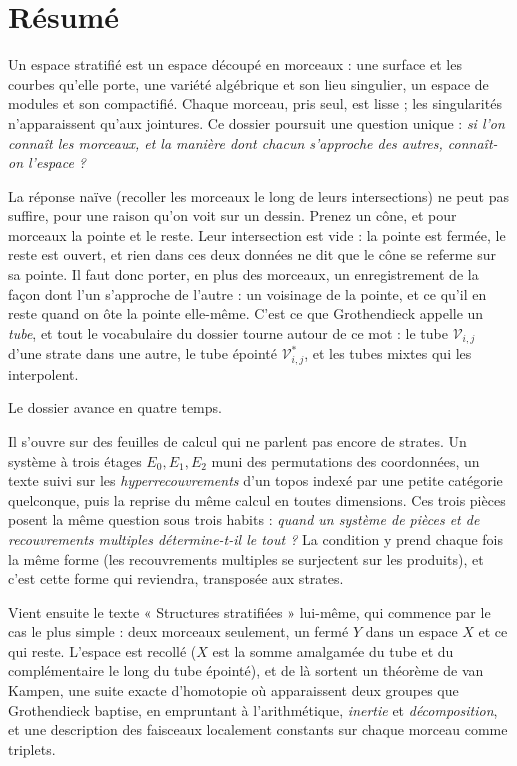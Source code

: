 \documentclass[11pt,a4paper]{article}
\begin{document}
\section*{Résumé}

\begin{resume}
Un espace stratifié est un espace découpé en morceaux : une surface et les
courbes qu'elle porte, une variété algébrique et son lieu singulier, un espace
de modules et son compactifié. Chaque morceau, pris seul, est lisse ; les
singularités n'apparaissent qu'aux jointures. Ce dossier poursuit une question
unique : \emph{si l'on connaît les morceaux, et la manière dont chacun
s'approche des autres, connaît-on l'espace ?}

La réponse naïve (recoller les morceaux le long de leurs intersections) ne
peut pas suffire, pour une raison qu'on voit sur un dessin. Prenez un cône,
et pour morceaux la pointe et le reste. Leur intersection est vide : la pointe
est fermée, le reste est ouvert, et rien dans ces deux données ne dit que le
cône se referme sur sa pointe. Il faut donc porter, en plus des morceaux, un
enregistrement de la façon dont l'un s'approche de l'autre : un voisinage de la
pointe, et ce qu'il en reste quand on ôte la pointe elle-même. C'est ce que
Grothendieck appelle un \emph{tube}, et tout le vocabulaire du dossier tourne
autour de ce mot : le tube $\mathcal{V}_{i,j}$ d'une strate dans une autre, le
tube épointé $\mathcal{V}^{*}_{i,j}$, et les tubes mixtes qui les interpolent.

Le dossier avance en quatre temps.

Il s'ouvre sur des feuilles de calcul qui ne parlent pas encore de strates. Un
système à trois étages $E_{0}, E_{1}, E_{2}$ muni des permutations des
coordonnées, un texte suivi sur les \emph{hyperrecouvrements} d'un topos indexé
par une petite catégorie quelconque, puis la reprise du même calcul en toutes
dimensions. Ces trois pièces posent la même question sous trois habits :
\emph{quand un système de pièces et de recouvrements multiples détermine-t-il
le tout ?} La condition y prend chaque fois la même forme (les recouvrements
multiples se surjectent sur les produits), et c'est cette forme qui reviendra,
transposée aux strates.

Vient ensuite le texte « Structures stratifiées » lui-même, qui commence par le
cas le plus simple : deux morceaux seulement, un fermé $Y$ dans un espace $X$
et ce qui reste. L'espace est recollé ($X$ est la somme amalgamée du tube et
du complémentaire le long du tube épointé), et de là sortent un théorème de van
Kampen, une suite exacte d'homotopie où apparaissent deux groupes que
Grothendieck baptise, en empruntant à l'arithmétique, \emph{inertie} et
\emph{décomposition}, et une description des faisceaux localement constants sur
chaque morceau comme triplets.


\end{resume}
\end{document}
